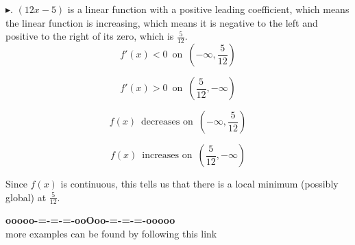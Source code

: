 \documentclass{ximera}
\begin{document}
\begin{example}
$\blacktriangleright$. $(12x - 5)$ is a linear function with a positive leading coefficient, which means the linear function is increasing, which means it is negative to the left and positive to the right of its zero, which is $\frac{5}{12}$. \\



\[
f'(x) < 0 \, \text{ on } \, \left( -\infty, \frac{5}{12} \right)
\]


\[
f'(x) > 0 \, \text{ on } \, \left( \frac{5}{12}, -\infty \right)
\]





\[
f(x)  \, \text{ decreases on } \, \left( -\infty, \frac{5}{12} \right)
\]


\[
f(x)  \, \text{ increases on } \, \left( \frac{5}{12}, -\infty \right)
\]



Since $f(x)$ is continuous, this tells us that there is a local minimum (possibly global) at $\frac{5}{12}$.


\end{example}










\begin{center}
\textbf{\textcolor{green!50!black}{ooooo-=-=-=-ooOoo-=-=-=-ooooo}} \\

more examples can be found by following this link\\ 

\end{center}
\end{document}

